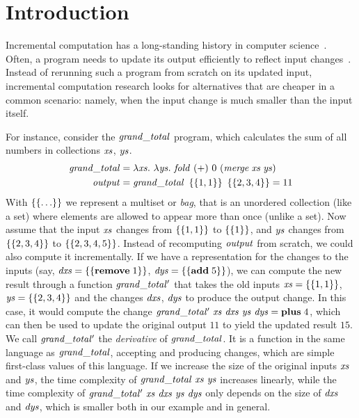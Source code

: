 
\section{Introduction}
\label{sec:intro}

Incremental computation has a long-standing history in computer
science~\citep{Ramalingam93}. Often, a program needs to update its
output efficiently to reflect input
changes~\citep{Salvaneschi13reactive}. Instead of rerunning such a
program from scratch on its updated input, incremental
computation research looks for alternatives that are cheaper in a common scenario:
namely, when the input change is much smaller than the input itself.

For instance, consider the $\mathit{grand\_total}$ program, which calculates
the sum of all numbers in collections $\mathit{xs}$, $\mathit{ys}$.
\begin{align*}
\Program & = \ProgramBody\\
\Output & = \Program~\Set{1,1}~\Set{2,3,4}=11
\end{align*}
With $\left\lbrace\left\lbrace\ldots\right\rbrace\right\rbrace$ we represent a multiset or \emph{bag}, that is an unordered collection (like a set)
where elements are allowed to appear more than once (unlike a set).
Now assume that the input $\mathit{xs}$ changes from $\left\lbrace\left\lbrace1,1\right\rbrace\right\rbrace$ to
$\left\lbrace\left\lbrace1\right\rbrace\right\rbrace$, and $\mathit{ys}$ changes from $\left\lbrace\left\lbrace2,3,4\right\rbrace\right\rbrace$ to $\left\lbrace\left\lbrace2,3,4,5\right\rbrace\right\rbrace$.
Instead of recomputing $\mathit{output}$ from scratch, we could also compute it incrementally. If we have a
representation for the changes to the inputs (say,
$\mathit{dxs} = \left\lbrace\left\lbrace\textbf{remove} \; 1\right\rbrace\right\rbrace$,
$\mathit{dys} = \left\lbrace\left\lbrace\textbf{add} \; 5\right\rbrace\right\rbrace$), we can compute the new
result through a function $\mathit{grand\_total'}$ that takes the old inputs
$\mathit{xs} = \left\lbrace\left\lbrace1,1\right\rbrace\right\rbrace$, $\mathit{ys}=\left\lbrace\left\lbrace2,3,4\right\rbrace\right\rbrace$ and the changes $\mathit{dxs}$,
$\mathit{dys}$ to produce the output change.
In this case, it would compute the change
$\mathit{grand\_total'}~\mathit{xs}~\mathit{dxs}~\mathit{ys}~\mathit{dys} = \textbf{plus} \; 4$,
which can then be used to update the original output $11$
%
to yield the updated result $15$. We call $\mathit{grand\_total'}$ the \emph{derivative} of $\mathit{grand\_total}$.
It is a function in the
same language as $\mathit{grand\_total}$, accepting and producing changes, which
are simple first-class values of this language.
%
If we increase the size of the original inputs $\mathit{xs}$ and $\mathit{ys}$, the time
complexity of $\mathit{grand\_total}~\mathit{xs}~\mathit{ys}$ increases linearly, while the time complexity
of $\mathit{grand\_total'}~\mathit{xs}~\mathit{dxs}~\mathit{ys}~\mathit{dys}$ only depends on the size of $\mathit{dxs}$ and $\mathit{dys}$,
which is smaller both in our example and in general.

